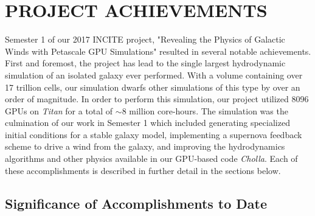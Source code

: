 \documentclass[11pt,letterpaper,english]{article}
\begin{document}
\setlength{\parindent}{0in} %

\pagestyle{fancy}   \renewcommand{%
\headrulewidth}{0.0pt}


\section{PROJECT ACHIEVEMENTS} 


Semester 1 of our 2017 INCITE project, "Revealing the Physics of Galactic Winds with Petascale GPU Simulations" resulted in several notable achievements. First and foremost, the project has lead to the single largest hydrodynamic simulation of an isolated galaxy ever performed. With a volume containing over 17 trillion cells, our simulation dwarfs other simulations of this type by over an order of magnitude. In order to perform this simulation, our project utilized 8096 GPUs on \textit{Titan} for a total of $\sim$8 million core-hours. The simulation was the culmination of our work in Semester 1 which included generating specialized initial conditions for a stable galaxy model, implementing a supernova feedback scheme to drive a wind from the galaxy, and improving the hydrodynamics algorithms and other physics available in our GPU-based code \textit{Cholla}. Each of these accomplishments is described in further detail in the sections below.

\subsection{Significance of Accomplishments to Date} 

\end{document}
